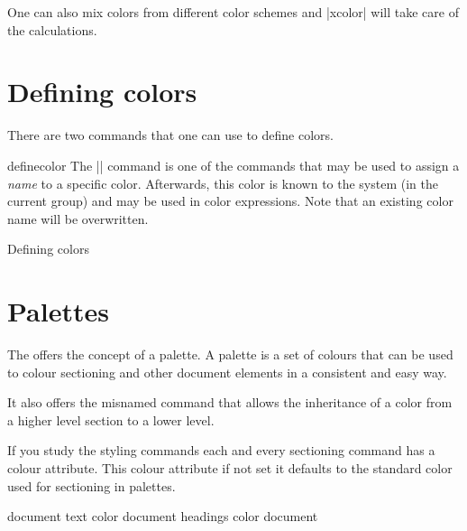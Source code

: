 One can also mix colors from different color schemes and |xcolor| will take care of the calculations.

\section{Defining colors}

There are two commands that one can use to define colors.

\begin{docCommand}{definecolor}{ }
The |\definecolor| command is one of the commands that may be used to assign a \textit{name} to a specific color. Afterwards, this color is known to the system (in the current group) and may be used in color expressions. Note that an existing color name will be overwritten.
\end{docCommand} 

\begin{texexample}{Defining colors}{}

\color{myblack}\lorem
\end{texexample}

\section{Palettes}

The  offers the concept of a palette. A palette is a set of colours that can be used to colour sectioning and other document elements in a consistent and easy way.

It also offers the misnamed command \cmd{\inherit} that allows the inheritance of a color from a higher level section to a lower level.

If you study the styling commands each and every sectioning command has a colour attribute. This colour attribute if not set it defaults to the standard color used for sectioning in palettes.


document text color
document headings color
document 











